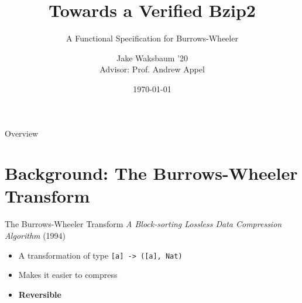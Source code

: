 \documentclass{beamer}
\title{Towards a Verified Bzip2}
\subtitle{A Functional Specification for Burrows-Wheeler}
\date{\today}
\author{Jake Waksbaum '20\\Advisor: Prof. Andrew Appel}
\institute{Princeton University}
\begin{document}
  \maketitle

  \begin{frame}{Overview}
    \tableofcontents
  \end{frame}

  \section{Background: The Burrows-Wheeler Transform}

  \begin{frame}{The Burrows-Wheeler Transform}
    \textit{A Block-sorting Lossless Data Compression Algorithm} (1994)
    \begin{itemize}
    \item<+-> A transformation of type \texttt{[a] -> ([a], Nat)}
    \item<+-> Makes it easier to compress
    \item<+-> \textbf{Reversible}
    \end{itemize}
  \end{frame}
\end{document}

